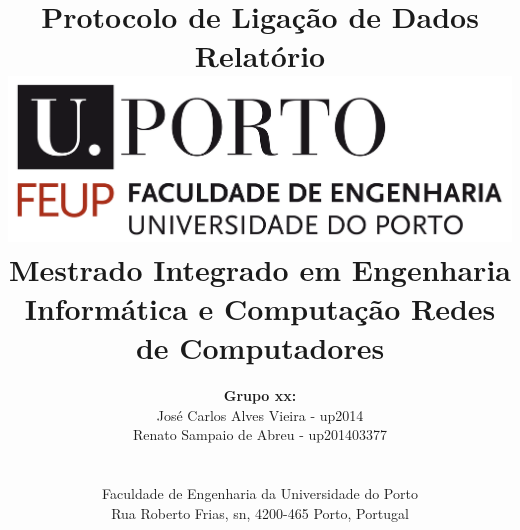 \documentclass[a4paper]{article}
\begin{document}
\setlength{\textwidth}{16cm}
\setlength{\textheight}{22cm}

\title{\Huge\textbf{Protocolo de Ligação de Dados}\linebreak\linebreak\linebreak
\Large\textbf{Relatório}\linebreak\linebreak
\linebreak\linebreak
\includegraphics[scale=0.1]{feup-logo.png}\linebreak\linebreak
\linebreak\linebreak
\Large{Mestrado Integrado em Engenharia Informática e Computação} \linebreak\linebreak
\Large{Redes de Computadores}\linebreak
}

\author{\textbf{Grupo xx:}\\
José Carlos Alves Vieira - up2014 \\
Renato Sampaio de Abreu - up201403377 \\
\linebreak\linebreak \\
 \\ Faculdade de Engenharia da Universidade do Porto \\ Rua Roberto Frias, s\/n, 4200-465 Porto, Portugal \linebreak\linebreak\linebreak
\linebreak\linebreak\vspace{1cm}}

\maketitle
\thispagestyle{empty}
\end{document}
